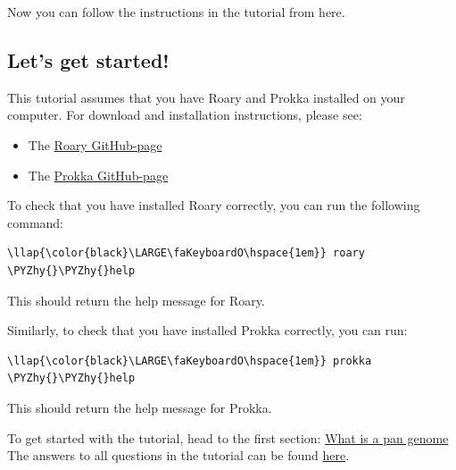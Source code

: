 \documentclass[11pt]{article}
\providecommand{\tightlist}{%
      \setlength{\itemsep}{0pt}\setlength{\parskip}{0pt}}
\def\PYZhy{\char`\-}
\begin{document}
Now you can follow the instructions in the tutorial from here.

\hypertarget{lets-get-started}{%
\subsection{Let's get started!}\label{lets-get-started}}

This tutorial assumes that you have Roary and Prokka installed on your
computer. For download and installation instructions, please see:

\begin{itemize}
\tightlist
\item
  The \href{https://github.com/sanger-pathogens/roary}{Roary
  GitHub-page}
\item
  The \href{https://github.com/tseemann/prokka}{Prokka GitHub-page}
\end{itemize}

To check that you have installed Roary correctly, you can run the
following command:

\begin{terminalinput}
\begin{Verbatim}[commandchars=\\\{\}]
\llap{\color{black}\LARGE\faKeyboardO\hspace{1em}} roary \PYZhy{}\PYZhy{}help
\end{Verbatim}
\end{terminalinput}

    This should return the help message for Roary.

Similarly, to check that you have installed Prokka correctly, you can
run:

\begin{terminalinput}
\begin{Verbatim}[commandchars=\\\{\}]
\llap{\color{black}\LARGE\faKeyboardO\hspace{1em}} prokka \PYZhy{}\PYZhy{}help
\end{Verbatim}
\end{terminalinput}

    This should return the help message for Prokka.

    To get started with the tutorial, head to the first section:
\href{pan_genome.ipynb}{What is a pan genome}\\
The answers to all questions in the tutorial can be found
\href{answers.ipynb}{here}.


\end{document}
